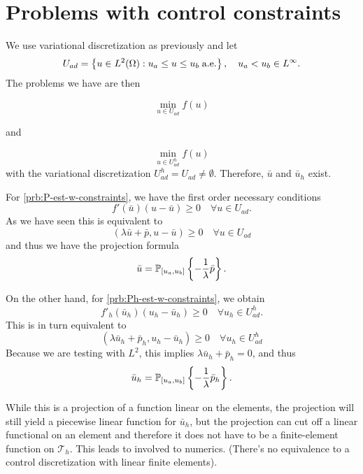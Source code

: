 \documentclass[../skript.tex]{subfiles}
\begin{document}
\section{Problems with control constraints}
We use variational discretization as previously and let
\[
	U_{ad} = \left\{ u \in L^2(\Omega) \mathrel{}:\mathrel{} u_a \leq u \leq u_b \; \text{a.e.} \right\}, \quad u_a < u_b \in L^\infty.
\]
The problems we have are then
\begin{problem}
\begin{equation}
\tag{$P$}
\label{prb:P-est-w-constraints}
\min_{u \in U_{ad}} f(u)
\end{equation}
\end{problem}
and
\begin{problem}
\begin{equation}
\tag{$P_h$}
\label{prb:Ph-est-w-constraints}
\min_{u \in U_{ad}^h} f(u)
\end{equation}
with the variational discretization $U_{ad}^h = U_{ad} \neq \emptyset$. Therefore, $\bar{u}$ and $\bar{u}_h$ exist.
\end{problem}

For \cref{prb:P-est-w-constraints}, we have the first order necessary conditions
\[
	f'(\bar{u})(u - \bar{u}) \geq 0 \quad \forall u \in U_{ad}.
\]
As we have seen this is equivalent to
\[
	\left( \lambda \bar{u} + \bar{p}, u - \bar{u} \right) \geq 0 \quad \forall u \in U_{ad}
\]
and thus we have the projection formula
\[
	\bar{u} = \mathbb{P}_{[u_a, u_b]} \left\{ - \frac{1}{\lambda} \bar{p} \right\}.
\]

On the other hand, for \cref{prb:Ph-est-w-constraints}, we obtain
\[
	f'_h(\bar{u}_h)(u_h - \bar{u}_h) \geq 0 \quad \forall u_h \in U_{ad}^h.
\]
This is in turn equivalent to
\[
	\left( \lambda \bar{u}_h + \bar{p}_h, u_h - \bar{u}_h \right) \geq 0 \quad \forall u_h \in U_{ad}^h
\]
Because we are testing with $L^2$, this implies $\lambda \bar{u}_h + \bar{p}_h = 0$, and thus
\[
	\bar{u}_h = \mathbb{P}_{[u_a, u_b]} \left\{ - \frac{1}{\lambda} \bar{p}_h \right\}.
\]

While this is a projection of a function linear on the elements, the projection will still yield a piecewise linear function for $\bar{u}_h$, but the projection can cut off a linear functional on an element and therefore it does not have to be a finite-element function on $\mathcal{T}_h$. This leads to involved to numerics. (There's no equivalence to a control discretization with linear finite elements).
\end{document}

